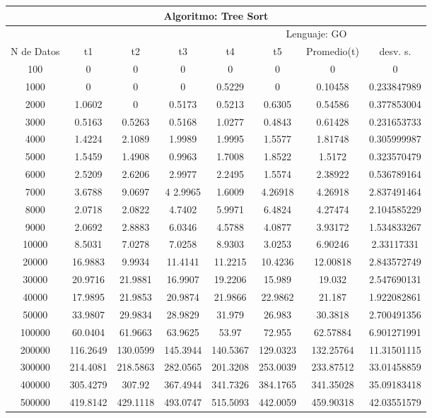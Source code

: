 \documentclass{article}
\begin{document}
	\begin{table}[]
        \begin{tabular}{|c|c|c|c|c|c|c|c| }
            \hline
            \multicolumn{8}{|c|}{Algoritmo: Tree Sort} \\ \hline
            \multicolumn{4}{|c|}{} & \multicolumn{4}{c|}{Lenguaje: GO} \\ \hline
              N de Datos &     t1    &  t2         &  t3          &   t4        &    t5     &   Promedio(t)       & desv. s. \\ \hline
100	    &0	    &0	    &0	        &0	    &0	    &0	      &0              \\ \hline
1000	&0	    &0	    &0	        & 0.5229&0	    &0.10458  &0.233847989     \\ \hline
2000	&1.0602	&0	    & 0.5173	&0.5213	&0.6305	&0.54586  &0.377853004\\ \hline
3000	&0.5163	&0.5263	& 0.5168	&1.0277	&0.4843	&0.61428  &0.231653733\\ \hline
4000	&1.4224	&2.1089	& 1.9989	&1.9995	&1.5577	&1.81748  &0.305999987\\ \hline
5000	&1.5459	&1.4908	& 0.9963	&1.7008	&1.8522	&1.5172	  &0.323570479\\ \hline
6000	&2.5209	&2.6206	& 2.9977	&2.2495	&1.5574	&2.38922  &0.536789164\\ \hline
7000	&3.6788	&9.0697	& 4	2.9965	&1.6009	&4.26918&4.26918    &2.837491464\\ \hline
8000	&2.0718	&2.0822	& 4.7402	&5.9971	&6.4824	&4.27474	&2.104585229\\ \hline
9000	&2.0692	&2.8883	& 6.0346	&4.5788	&4.0877	&3.93172	&1.534833267\\ \hline
10000	&8.5031	&7.0278	& 7.0258	&8.9303	&3.0253	&6.90246	&2.33117331\\ \hline
20000	&16.9883&	9.9934	& 11.4141	&11.2215	&10.4236	&12.00818	&2.843572749\\ \hline
30000	&20.9716&	21.9881	& 16.9907	&19.2206	&15.989	    &19.032	    &2.547690131\\ \hline
40000	&17.9895&	21.9853	& 20.9874	&21.9866	&22.9862	&21.187	    &1.922082861\\ \hline
50000	&33.9807&	29.9834	& 28.9829	&31.979	    &26.983	    &30.3818	&2.700491356\\ \hline
100000	&60.0404&	61.9663	& 63.9625	&53.97	    &72.955	    &62.57884	&6.901271991\\ \hline
200000	&116.2649&	130.0599&	145.3944 &140.5367	&129.0323	&132.25764	&11.31501115\\ \hline
300000	&214.4081&	218.5863&	282.0565 &201.3208	&253.0039	&233.87512	&33.01458859\\ \hline
400000	&305.4279&	307.92	& 367.4944	 &341.7326	&384.1765	&341.35028	&35.09183418\\ \hline
500000	&419.8142&	429.1118&	493.0747 &515.5093	&442.0059	&459.90318  & 42.03551579\\ \hline


       \end{tabular}
   \end{table}
		
\end{document}
